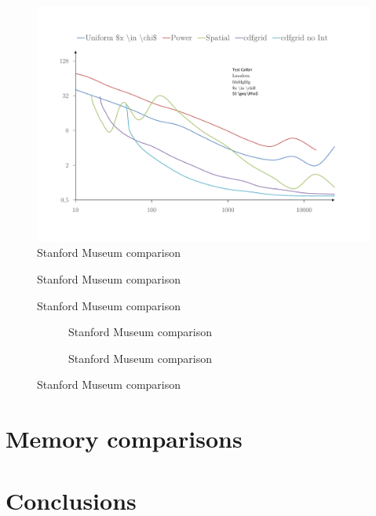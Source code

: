 \begin{figure}
    \centering
    \includegraphics[width=1\textwidth]{figures/plots/SM_Main.pdf}
    \caption{Stanford Museum comparison}
    \label{fig:asfsgfa}
\end{figure}


\begin{figure}
    \centering
    \caption{Stanford Museum comparison}
    \label{fig:asddhrgfdgffa}
\end{figure}

\begin{figure}
    \centering
    \caption{Stanford Museum comparison}
    \label{fig:asghgffasfdgffa}
\end{figure}

\begin{figure}
    \centering
    \begin{subfigure}{.5\textwidth}
      \centering
        \caption{Stanford Museum comparison}
        \label{fig:asgffagsgsgsfdgffa}
    \end{subfigure}%
    \begin{subfigure}{.5\textwidth}
        \caption{Stanford Museum comparison}
        \label{fig:asgffasgdgdssfdgffa}
    \end{subfigure}
\end{figure}

\section{Memory comparisons}

\section{Conclusions}

